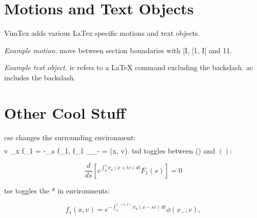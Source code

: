 \section{Motions and Text Objects}

VimTex adds various LaTex specific motions and text objects.

\emph{Example motion.} move between section boundaries with [I, [1, I[ and 11.

\emph{Example text object.} ic refers to a LaTeX command excluding the
backslash. ac includes the backslash.

\section{Other Cool Stuff}
cse changes the surrounding environment:
\begin{align*}

\end{align*}
    v \cdot \nabla_x f_1 = -\sigma_a f_1, \quad f_1 \rvert_{\Gamma_-} = \phi(x, v).
tsd toggles between () and \( \left( \right) \):

\begin{equation*}
    \frac{d}{ds} \left[ e^{\int_k^s \sigma_a(x+ tv)\, dt} F_1(s) \right] = 0
\end{equation*}

tse toggles the * in environments:

\begin{equation}
    f_1(x, v) = e^{-\int_o^{\tau_-(x, v)} \sigma_a(x - sv)\, dt} \phi(x_-, v),
\end{equation}
